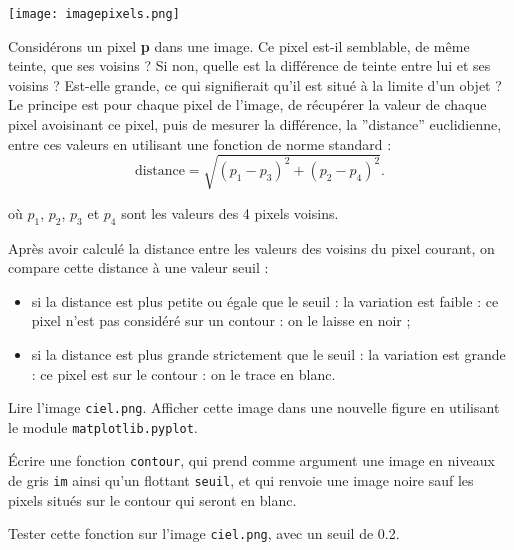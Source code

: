 \begin{marginfigure}
\centering
\texttt{[image: imagepixels.png]}
\end{marginfigure}


Considérons un pixel \textbf{p} dans une image. Ce pixel est-il semblable, de même teinte, que ses voisins ? Si non, quelle est la différence de teinte entre lui et ses voisins ? Est-elle grande, ce qui signifierait qu’il est situé à la limite d’un objet ?\\
Le principe est pour chaque pixel de l'image, de récupérer la valeur de chaque pixel avoisinant ce pixel, puis de mesurer la différence, la ”distance” euclidienne, entre ces valeurs en utilisant une fonction de norme standard :
$$
\text{distance}=\sqrt{(p_1-p_3)^2+(p_2-p_4)^2}.
$$



 où $ p_1$, $p_2$, $ p_3$ et $ p_4$ sont les valeurs des 4 pixels voisins.


Après avoir calculé la distance entre les valeurs des voisins du pixel courant, on compare cette distance à une valeur seuil :
\begin{itemize}
\item si la distance est plus petite ou égale que le seuil : la variation est faible : ce pixel n'est pas considéré sur un contour : on le laisse en noir ;
\item si la distance est plus grande strictement que le seuil : la variation est grande : ce pixel est sur le contour : on le trace en blanc.
\end{itemize}


\begin{question}
Lire l'image \texttt{ciel.png}. Afficher cette image dans une nouvelle figure en utilisant le module \texttt{matplotlib.pyplot}.
\end{question}



\begin{question}
\'Ecrire une fonction \texttt{contour}, qui prend comme argument une image en niveaux de gris \texttt{im} ainsi qu'un flottant \texttt{seuil}, et qui renvoie une image noire sauf les pixels situés sur le contour qui seront en blanc.
\end{question}

\begin{question}
Tester cette fonction sur l'image  \texttt{ciel.png}, avec un seuil de 0.2.
\end{question}

